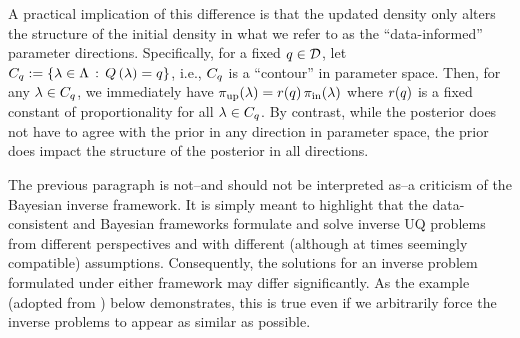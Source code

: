 A practical implication of this difference is that the updated density only alters the structure of the initial density in what we refer to as the ``data-informed'' parameter directions.
Specifically, for a fixed $q\in\mathcal{D}$, let $C_q := \left\{\lambda\in{\Lambda}\, : \, Q\left ( \lambda \right )=q\right\}$, i.e., $C_q$ is a ``contour'' in parameter space.
Then, for any $\lambda\in C_q$, we immediately have $\operatorname*{\pi_{up}}(\lambda)=r(q)\operatorname*{\pi_{in}}(\lambda)$ where $r(q)$ is a fixed constant of proportionality for all $\lambda\in C_q$.
By contrast, while the posterior does not have to agree with the prior in any direction in parameter space, the prior does impact the structure of the posterior in all directions.

The previous paragraph is not\---and should not be interpreted as\---a criticism of the Bayesian inverse framework.
It is simply meant to highlight that the data-consistent and Bayesian frameworks formulate and solve inverse UQ problems from different perspectives and with different (although at times seemingly compatible) assumptions.
Consequently, the solutions for an inverse problem formulated under either framework may differ significantly.
As the example (adopted from \cite{BJW18a, BJW18b}) below demonstrates, this is true even if we arbitrarily force the inverse problems to appear as similar as possible.

\FloatBarrier

